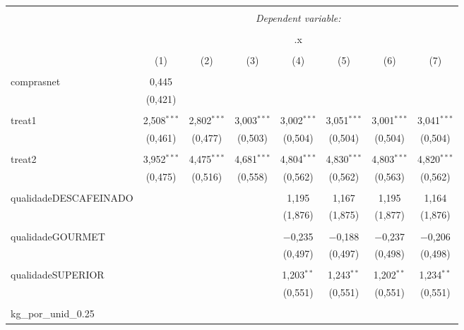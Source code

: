 
\begin{table}[!htbp] \centering 
  \caption{} 
  \label{} 
\begin{tabular}{@{\extracolsep{5pt}}lccccccc} 
\\[-1.8ex]\hline 
\hline \\[-1.8ex] 
 & \multicolumn{7}{c}{\textit{Dependent variable:}} \\ 
\cline{2-8} 
\\[-1.8ex] & \multicolumn{7}{c}{.x} \\ 
\\[-1.8ex] & (1) & (2) & (3) & (4) & (5) & (6) & (7)\\ 
\hline \\[-1.8ex] 
 comprasnet & 0,445 &  &  &  &  &  &  \\ 
  & (0,421) &  &  &  &  &  &  \\ 
  & & & & & & & \\ 
 treat1 & 2,508$^{***}$ & 2,802$^{***}$ & 3,003$^{***}$ & 3,002$^{***}$ & 3,051$^{***}$ & 3,001$^{***}$ & 3,041$^{***}$ \\ 
  & (0,461) & (0,477) & (0,503) & (0,504) & (0,504) & (0,504) & (0,504) \\ 
  & & & & & & & \\ 
 treat2 & 3,952$^{***}$ & 4,475$^{***}$ & 4,681$^{***}$ & 4,804$^{***}$ & 4,830$^{***}$ & 4,803$^{***}$ & 4,820$^{***}$ \\ 
  & (0,475) & (0,516) & (0,558) & (0,562) & (0,562) & (0,563) & (0,562) \\ 
  & & & & & & & \\ 
 qualidadeDESCAFEINADO &  &  &  & 1,195 & 1,167 & 1,195 & 1,164 \\ 
  &  &  &  & (1,876) & (1,875) & (1,877) & (1,876) \\ 
  & & & & & & & \\ 
 qualidadeGOURMET &  &  &  & $-$0,235 & $-$0,188 & $-$0,237 & $-$0,206 \\ 
  &  &  &  & (0,497) & (0,497) & (0,498) & (0,498) \\ 
  & & & & & & & \\ 
 qualidadeSUPERIOR &  &  &  & 1,203$^{**}$ & 1,243$^{**}$ & 1,202$^{**}$ & 1,234$^{**}$ \\ 
  &  &  &  & (0,551) & (0,551) & (0,551) & (0,551) \\ 
  & & & & & & & \\ 
 kg\_por\_unid\_0.25 &  &  &  &  &  &  &  \\ 

\end{tabular}
\end{table}
